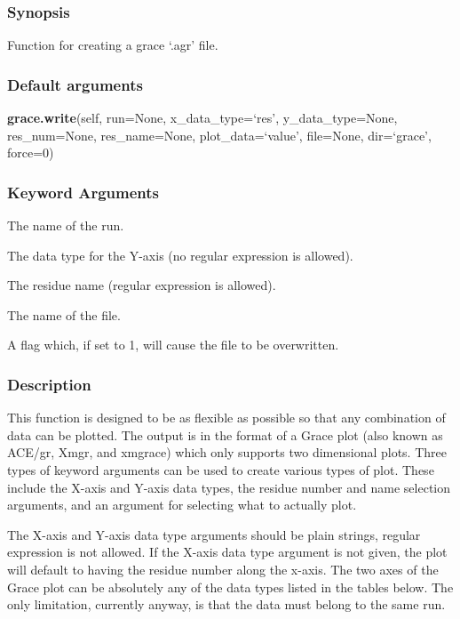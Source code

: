 \subsubsection{Synopsis}

Function for creating a grace `.agr' file.

\subsubsection{Default arguments}

\textsf{\textbf{grace.write}(self, run=None, x\_data\_type=`res', y\_data\_type=None, res\_num=None, res\_name=None, plot\_data=`value', file=None, dir=`grace', force=0)}


\subsubsection{Keyword Arguments}

  The name of the run.

  The data type for the Y-axis (no regular expression is allowed).

  The residue name (regular expression is allowed).

  The name of the file.

  A flag which, if set to 1, will cause the file to be overwritten.

\subsubsection{Description}

This function is designed to be as flexible as possible so that any combination of data can
be plotted.  The output is in the format of a Grace plot (also known as ACE/gr, Xmgr, and
xmgrace) which only supports two dimensional plots.  Three types of keyword arguments can
be used to create various types of plot.  These include the X-axis and Y-axis data types,
the residue number and name selection arguments, and an argument for selecting what to
actually plot.

The X-axis and Y-axis data type arguments should be plain strings, regular expression is not
allowed.  If the X-axis data type argument is not given, the plot will default to having the
residue number along the x-axis.  The two axes of the Grace plot can be absolutely any of
the data types listed in the tables below.  The only limitation, currently anyway, is that
the data must belong to the same run.

